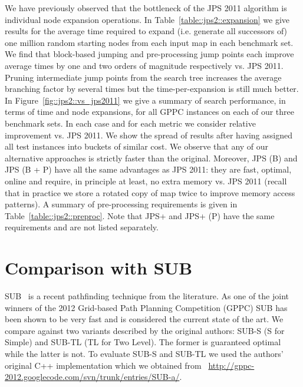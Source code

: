 We have previously observed that the bottleneck of the JPS 2011 algorithm is
individual node expansion operations. In Table~\ref{table::jps2::expansion} we
give results for the average time required to expand (i.e. generate all
successors of) one million random starting nodes from each input map in each
benchmark set. We find that block-based jumping and pre-processing jump points
each improve average times by one and two orders of magnitude respectively vs.
JPS 2011.  Pruning intermediate jump points from the search tree increases the
average branching factor by several times but the time-per-expansion is still
much better.  In Figure~\ref{fig::jps2::vs_jps2011} we give a summary of
search performance, in terms of time and node expansions, for all GPPC
instances on each of our three benchmark sets.  In each case and for each
metric we consider relative improvement vs. JPS 2011.  We show the spread of
results after having assigned all test instances into buckets of similar
cost.  We observe that any of our alternative approaches is strictly faster
than the original.  Moreover, JPS (B) and JPS (B + P) have all the same
advantages as JPS 2011: they are fast, optimal, online and require, in
principle at least, no extra memory vs. JPS 2011 (recall that in practice we
store a rotated copy of map twice to improve memory access patterns).  A
summary of pre-processing requirements is given in
Table~\ref{table::jps2::preproc}. Note that JPS+ and JPS+ (P) have the same
requirements and are not listed separately.



\section{Comparison with SUB}
SUB~\cite{urasKH13} is a recent pathfinding technique from the literature.
As one of the joint winners of the 2012 Grid-based Path Planning Competition (GPPC) 
SUB has been shown to be very fast and is considered the current state of the art.
We compare against two variants described by the original authors: SUB-S (S
for Simple) and SUB-TL (TL for Two Level). The former is guaranteed optimal
while the latter is not.  To evaluate SUB-S and SUB-TL we used the authors'
original C++ implementation which we obtained from~{\small
\url{http://gppc-2012.googlecode.com/svn/trunk/entries/SUB-a/}}.


